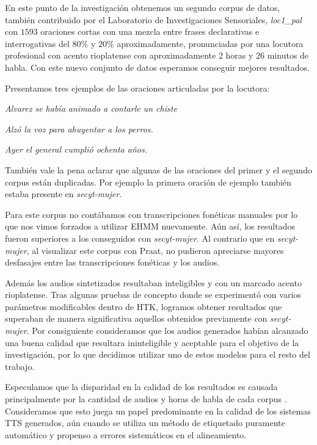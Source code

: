 En este punto de la investigación obtenemos un segundo corpus de datos, también contribuido por el Laboratorio de Investigaciones Sensoriales, \textit{loc1\_pal} \cite{loc1pal} con $1593$ oraciones cortas con una mezcla entre frases declarativas e interrogativas del $80\%$ y $20\%$ aproximadamente, pronunciadas por una locutora profesional con acento rioplatense con aproximadamente $2$ horas y $26$ minutos de habla. Con este nuevo conjunto de datos esperamos conseguir mejores resultados.

Presentamos tres ejemplos de las oraciones articuladas por la locutora:

\indent\indent \textit{Alvarez se había animado a contarle un chiste}

\indent\indent \textit{Alzó la voz para ahuyentar a los perros.}

\indent\indent \textit{Ayer el general cumplió ochenta años.}

También vale la pena aclarar que algunas de las oraciones del primer y el segundo corpus están duplicadas. Por ejemplo la primera oración de ejemplo también estaba presente en \textit{secyt-mujer}.

Para este corpus no contábamos con transcripciones fonéticas manuales por lo que nos vimos forzados a utilizar EHMM nuevamente. Aún así, los resultados fueron superiores a los conseguidos con \textit{secyt-mujer}. Al contrario que en \textit{secyt-mujer}, al visualizar este corpus con Praat, no pudieron apreciarse mayores desfasajes entre las transcripciones fonéticas y los audios.

Además los audios sintetizados resultaban inteligibles y con un marcado acento rioplatense. Tras algunas pruebas de concepto donde se experimentó con varios parámetros modificables dentro de HTK, logramos obtener resultados que superaban de manera significativa aquellos obtenidos previamente con \textit{secyt-mujer}. Por consiguiente consideramos que los audios generados habían alcanzado una buena calidad que resultara ininteligible y aceptable para el objetivo de la investigación, por lo que decidimos utilizar uno de estos modelos para el resto del trabajo.


Especulamos que la disparidad en la calidad de los resultados es causada principalmente por la cantidad de audios y horas de habla de cada corpus \cite{phoneticAndProsodic}. Consideramos que esto juega un papel predominante en la calidad de los sistemas TTS generados, aún cuando se utiliza un método de etiquetado puramente automático y propenso a errores sistemáticos en el alineamiento.

